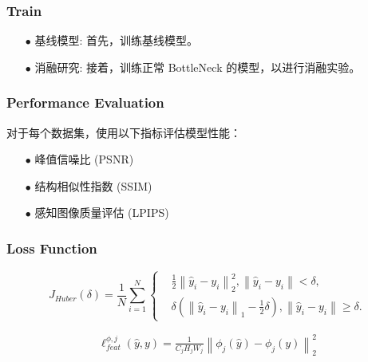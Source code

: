 \documentclass[a4paper, 10pt]{article}
\begin{document}
		\subsubsection{Train}
		
		\begin{itemize}
			\item [$\bullet$]
			基线模型: 首先，训练基线模型。
			
			\item [$\bullet$]
			消融研究: 接着，训练正常 BottleNeck 的模型，以进行消融实验。
		\end{itemize}
		
		\subsubsection{Performance Evaluation}
		
		对于每个数据集，使用以下指标评估模型性能：
		
		\begin{itemize}
			\item[$\bullet$]
			峰值信噪比 (PSNR)
			\item[$\bullet$]
			结构相似性指数 (SSIM)
			\item[$\bullet$]
			感知图像质量评估 (LPIPS)
		\end{itemize}
				
		\subsubsection{Loss Function}
		
		\begin{equation}
			J_{Huber}(\delta)= \frac{1}{N}\sum_{i=1}^{N}
			\left\{
			\begin{aligned}
				&\frac{1}{2}{\left\|\hat{y}_i - y_i \right\|}_2^{2}, \left\| \hat{y}_i -y_i \right\| < \delta , \\
				&\delta\left({\left\|\hat{y}_i - y_i \right\|}_1 - \frac{1}{2}\delta \right), \left\| \hat{y}_i -y_i \right\| \geq \delta.
			\end{aligned}
			\right.
			\label{eq: huber loss}
		\end{equation}
		
		\begin{equation}
			\begin{aligned}
				\ell_{feat}^{\phi,j} (\hat{y},y) = \frac{1}{C_{j}H_{j}W_{j}}{\left\| \phi_{j}(\hat{y})-\phi_{j}(y)\right\|}_{2}^2
			\end{aligned}
			\label{eq: perceptual loss}
		\end{equation}
		
\end{document}
